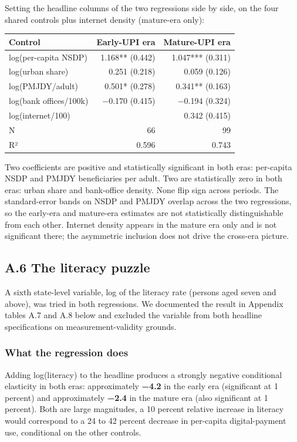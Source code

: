 \documentclass[
]{article}
\begin{document}
Setting the headline columns of the two regressions side by side, on the
four shared controls plus internet density (mature-era only):

\begin{longtable}[]{@{}lrr@{}}
\toprule\noalign{}
Control & Early-UPI era & Mature-UPI era \\
\midrule\noalign{}
\endhead
\bottomrule\noalign{}
\endlastfoot
log(per-capita NSDP) & 1.168** (0.442) & 1.047*** (0.311) \\
log(urban share) & 0.251 (0.218) & 0.059 (0.126) \\
log(PMJDY/adult) & 0.501* (0.278) & 0.341** (0.163) \\
log(bank offices/100k) & −0.170 (0.415) & −0.194 (0.324) \\
log(internet/100) & & 0.342 (0.415) \\
N & 66 & 99 \\
R² & 0.596 & 0.743 \\
\end{longtable}

Two coefficients are positive and statistically significant in both
eras: per-capita NSDP and PMJDY beneficiaries per adult. Two are
statistically zero in both eras: urban share and bank-office density.
None flip sign across periods. The standard-error bands on NSDP and
PMJDY overlap across the two regressions, so the early-era and
mature-era estimates are not statistically distinguishable from each
other. Internet density appears in the mature era only and is not
significant there; the asymmetric inclusion does not drive the cross-era
picture.

\subsection{A.6 The literacy puzzle}\label{a.6-the-literacy-puzzle}

A sixth state-level variable, log of the literacy rate (persons aged
seven and above), was tried in both regressions. We documented the
result in Appendix tables A.7 and A.8 below and excluded the variable
from both headline specifications on measurement-validity grounds.

\subsubsection{What the regression does}\label{what-the-regression-does}

Adding log(literacy) to the headline produces a strongly negative
conditional elasticity in both eras: approximately \textbf{−4.2} in the
early era (significant at 1 percent) and approximately \textbf{−2.4} in
the mature era (also significant at 1 percent). Both are large
magnitudes, a 10 percent relative increase in literacy would correspond
to a 24 to 42 percent decrease in per-capita digital-payment use,
conditional on the other controls.
\end{document}
